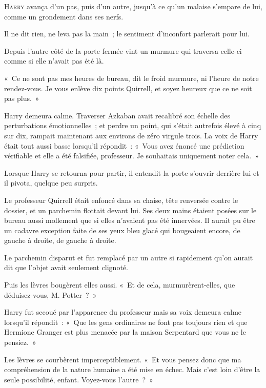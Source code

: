 
\lettrine{H}{arry} avança d'un pas, puis d'un autre, jusqu'à ce qu'un malaise s'empare de lui, comme un grondement dans ses nerfs.

Il ne dit rien, ne leva pas la main~; le sentiment d'inconfort parlerait pour lui.

Depuis l'autre côté de la porte fermée vint un murmure qui traversa celle-ci comme si elle n'avait pas été là.

«~Ce ne sont pas mes heures de bureau, dit le froid murmure, ni l'heure de notre rendez-vous. Je vous enlève dix points Quirrell, et soyez heureux que ce ne soit pas plus.~»

Harry demeura calme. Traverser Azkaban avait recalibré son échelle des perturbations émotionnelles~; et perdre un point, qui s'était autrefois élevé à cinq sur dix, rampait maintenant aux environs de zéro virgule trois. La voix de Harry était tout aussi basse lorsqu'il répondit~: «~Vous avez énoncé une prédiction vérifiable et elle a été falsifiée, professeur. Je souhaitais uniquement noter cela.~»

Lorsque Harry se retourna pour partir, il entendit la porte s'ouvrir derrière lui et il pivota, quelque peu surpris.

Le professeur Quirrell était enfoncé dans sa chaise, tête renversée contre le dossier, et un parchemin flottait devant lui. Ses deux mains étaient posées sur le bureau aussi mollement que si elles n'avaient pas été innervées. Il aurait pu être un cadavre exception faite de ses yeux bleu glacé qui bougeaient encore, de gauche à droite, de gauche à droite.

Le parchemin disparut et fut remplacé par un autre si rapidement qu'on aurait dit que l'objet avait seulement clignoté.

Puis les lèvres bougèrent elles aussi. «~Et de cela, murmurèrent-elles, que déduisez-vous, M. Potter~?~»

Harry fut secoué par l'apparence du professeur mais sa voix demeura calme lorsqu'il répondit~: «~Que les gens ordinaires ne font pas toujours rien et que Hermione Granger est plus menacée par la maison Serpentard que vous ne le pensiez.~»

Les lèvres se courbèrent imperceptiblement. «~Et vous pensez donc que ma compréhension de la nature humaine a été mise en échec. Mais c'est loin d'être la seule possibilité, enfant. Voyez-vous l'autre~?~»

